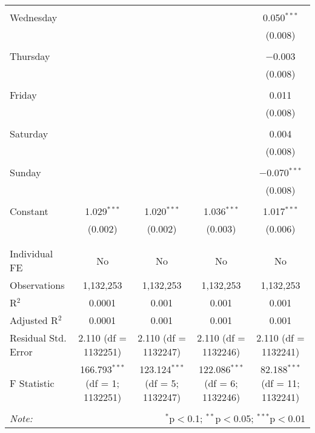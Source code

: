 \documentclass[
]{article}
\begin{document}
\begin{table}[!htbp]
{\begin{tabular}{@{\extracolsep{5pt}}lcccc}
  & & & & \\ 
 Wednesday &  &  &  & 0.050$^{***}$ \\ 
  &  &  &  & (0.008) \\ 
  & & & & \\ 
 Thursday &  &  &  & $-$0.003 \\ 
  &  &  &  & (0.008) \\ 
  & & & & \\ 
 Friday &  &  &  & 0.011 \\ 
  &  &  &  & (0.008) \\ 
  & & & & \\ 
 Saturday &  &  &  & 0.004 \\ 
  &  &  &  & (0.008) \\ 
  & & & & \\ 
 Sunday &  &  &  & $-$0.070$^{***}$ \\ 
  &  &  &  & (0.008) \\ 
  & & & & \\ 
 Constant & 1.029$^{***}$ & 1.020$^{***}$ & 1.036$^{***}$ & 1.017$^{***}$ \\ 
  & (0.002) & (0.002) & (0.003) & (0.006) \\ 
  & & & & \\ 
\hline \\[-1.8ex] 
Individual FE & No & No & No & No \\ 
Observations & 1,132,253 & 1,132,253 & 1,132,253 & 1,132,253 \\ 
R$^{2}$ & 0.0001 & 0.001 & 0.001 & 0.001 \\ 
Adjusted R$^{2}$ & 0.0001 & 0.001 & 0.001 & 0.001 \\ 
Residual Std. Error & 2.110 (df = 1132251) & 2.110 (df = 1132247) & 2.110 (df = 1132246) & 2.110 (df = 1132241) \\ 
F Statistic & 166.793$^{***}$ (df = 1; 1132251) & 123.124$^{***}$ (df = 5; 1132247) & 122.086$^{***}$ (df = 6; 1132246) & 82.188$^{***}$ (df = 11; 1132241) \\ 
\hline 
\hline \\[-1.8ex] 
\textit{Note:}  & \multicolumn{4}{r}{$^{*}$p$<$0.1; $^{**}$p$<$0.05; $^{***}$p$<$0.01} \\ 
\end{tabular}
} 
\end{table} 
\newpage
\end{document}
